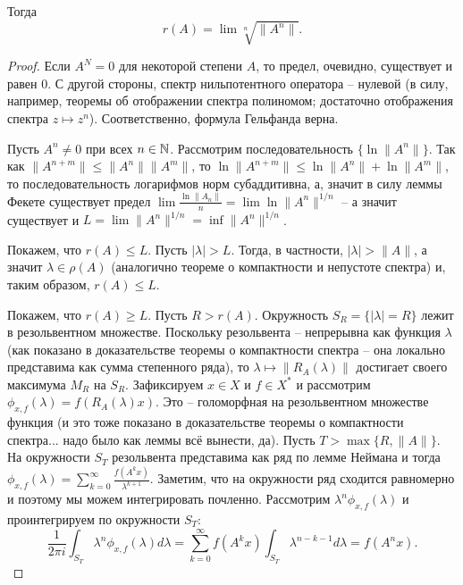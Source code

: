 \begin{theorem}[Гельфанд]
    Тогда
    \[
        r(A) = \lim \sqrt[n]{\|A^n\|}.
    \]
\end{theorem}
\begin{proof}
    Если $A^N = 0$ для некоторой степени $A$, то предел, очевидно, существует и равен $0$.
    С другой стороны, спектр нильпотентного оператора -- нулевой (в силу, например, теоремы об отображении спектра полиномом; достаточно отображения спектра $z \mapsto z^n$). Соответственно, формула Гельфанда верна.
    
    Пусть $A^n \neq 0$ при всех $n \in \mathbb{N}$.
    Рассмотрим последовательность $\{\ln \|A^n\|\}$.
    Так как $\|A^{n + m}\| \leq \|A^n\|\|A^m\|$, то $\ln \|A^{n + m}\| \leq \ln \|A^n\| + \ln \|A^m\|$, то последовательность логарифмов норм субаддитивна, а, значит в силу леммы Фекете существует предел $\lim \frac{\ln \|A_n\|}{n} = \lim \ln \|A^n\|^{1/n}$ -- а значит существует и $L = \lim \|A^n\|^{1/n} = \inf \|A^n\|^{1/n}$.

    Покажем, что $r(A) \leq L$.
    Пусть $|\lambda| > L$. Тогда, в частности, $|\lambda| > \|A\|$, а значит $\lambda \in \rho(A)$ (аналогично теореме о компактности и непустоте спектра) и, таким образом, $r(A) \leq L$.

    Покажем, что $r(A) \geq L$.
    Пусть $R > r(A)$.
    Окружность $S_R = \{|\lambda| = R\}$ лежит в резольвентном множестве.
    Поскольку резольвента -- непрерывна как функция $\lambda$ (как показано в доказательстве теоремы о компактности спектра -- она локально представима как сумма степенного ряда), то $\lambda \mapsto \|R_A(\lambda)\|$ достигает своего максимума $M_R$ на $S_R$.
    Зафиксируем $x \in X$ и $f \in X^*$ и рассмотрим $\phi_{x, f}(\lambda) = f(R_A(\lambda)x)$.
    Это -- голоморфная на резольвентном множестве функция (и это тоже показано в доказательстве теоремы о компактности спектра... надо было как леммы всё вынести, да).
    Пусть $T > \max\{R, \|A\|\}$.
    На окружности $S_T$ резольвента представима как ряд по лемме Неймана и тогда $\phi_{x, f}(\lambda) = \sum_{k = 0}^{\infty}\frac{f(A^k x)}{\lambda^{k + 1}}$.
    Заметим, что на окружности ряд сходится равномерно и поэтому мы можем интегрировать почленно.
    Рассмотрим $\lambda^n \phi_{x, f}(\lambda)$ и проинтегрируем по окружности $S_T\colon$
    \[
        \frac{1}{2\pi i} \int_{S_T} \lambda^n \phi_{x, f}(\lambda)d\lambda = \sum_{k = 0}^{\infty} f(A^k x)\int_{S_T} \lambda^{n - k - 1}d\lambda = f(A^n x).
    \]


\end{proof}
